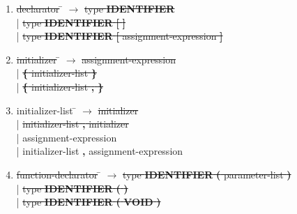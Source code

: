 \documentclass[12pt]{article}
\begin{document}
\begin{enumerate}
\item \begin{tabbing} \sout{declarator} \= $\rightarrow$ \= \sout{type \textbf{IDENTIFIER}} \\
	\> \hspace*{0.05cm} | \> \sout{type \textbf{IDENTIFIER} \textbf{[} \textbf{]}} \\
	\> \hspace*{0.05cm} | \> \sout{type \textbf{IDENTIFIER} \textbf{[} assignment-expression \textbf{]}}\\
\end{tabbing}

\item \begin{tabbing} \sout{initializer} \= $\rightarrow$ \= \sout{assignment-expression} \\
	\> \hspace*{0.05cm} | \> \sout{\textbf{\{} initializer-list \textbf{\}}} \\
	\> \hspace*{0.05cm} | \> \sout{\textbf{\{} initializer-list \textbf{,} \textbf{\}}} \\
\end{tabbing}

\item \begin{tabbing} initializer-list \= $\rightarrow$ \= \sout{initializer} \\
	\> \hspace*{0.05cm} | \> \sout{initializer-list \textbf{,} initializer} \\
	\> \hspace*{0.05cm} | \> assignment-expression \\
	\> \hspace*{0.05cm} | \> initializer-list \textbf{,} assignment-expression \\
\end{tabbing}

\item \begin{tabbing} \sout{function-declarator} \= $\rightarrow$ \= \sout{type \textbf{IDENTIFIER} \textbf{(} parameter-list \textbf{)}} \\
	\> \hspace*{0.05cm} | \> \sout{type \textbf{IDENTIFIER} \textbf{(} \textbf{)} } \\
	\> \hspace*{0.05cm} | \> \sout{type \textbf{IDENTIFIER} \textbf{(} \textbf{VOID} \textbf{)}} \\
\end{tabbing}


\end{enumerate}
\end{document}
